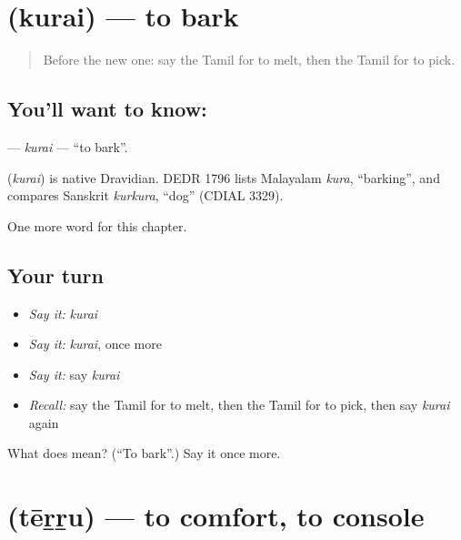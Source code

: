 \section[\texorpdfstring{\ta{குரை} (kurai)}{குரை (kurai)}]{ (kurai) — to bark}

\label{lesson:TA-C258-kurai}



\begin{quote}
Before the new one: say the Tamil for to melt, then the Tamil for to pick.
\end{quote}

\subsection*{You'll want to know: }
\textbf{} — \emph{kurai} — \textquotedblleft{}to bark\textquotedblright{}.

\begin{cousinweb}
\textbf{} (\emph{kurai}) is native Dravidian. DEDR 1796 lists Malayalam \emph{kura}, \textquotedblleft{}barking\textquotedblright{}, and compares Sanskrit \emph{kurkura}, \textquotedblleft{}dog\textquotedblright{} (CDIAL 3329).
\end{cousinweb}

\begin{grammarlens}[title={What you've built}]
One more word for this chapter.
\end{grammarlens}

\subsection*{Your turn}
\begin{itemize}
\raggedright
  \item \emph{Say it:} \emph{kurai}
  \item \emph{Say it:} \emph{kurai}, once more
  \item \emph{Say it:} say \emph{kurai}
  \item \emph{Recall:} say the Tamil for to melt, then the Tamil for to pick, then say \emph{kurai} again
\end{itemize}

\begin{tcolorbox}[breakable,colback=teal!4,colframe=teal!35!black,title={Before you move on}]
What does  mean? (\textquotedblleft{}To bark\textquotedblright{}.) Say it once more.
\end{tcolorbox}
\section[\texorpdfstring{\ta{தேற்று} (tēṟṟu)}{தேற்று (tēṟṟu)}]{ (tēṟṟu) — to comfort, to console}

